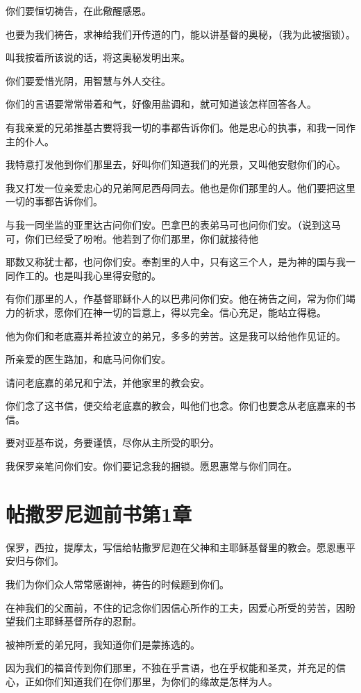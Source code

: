 \documentclass[12pt,oneside]{book}
\begin{document}
你们要恒切祷告，在此儆醒感恩。

也要为我们祷告，求神给我们开传道的门，能以讲基督的奥秘，（我为此被捆锁）。

叫我按着所该说的话，将这奥秘发明出来。

你们要爱惜光阴，用智慧与外人交往。

你们的言语要常常带着和气，好像用盐调和，就可知道该怎样回答各人。

有我亲爱的兄弟推基古要将我一切的事都告诉你们。他是忠心的执事，和我一同作主的仆人。

我特意打发他到你们那里去，好叫你们知道我们的光景，又叫他安慰你们的心。

我又打发一位亲爱忠心的兄弟阿尼西母同去。他也是你们那里的人。他们要把这里一切的事都告诉你们。

与我一同坐监的亚里达古问你们安。巴拿巴的表弟马可也问你们安。（说到这马可，你们已经受了吩咐。他若到了你们那里，你们就接待他

耶数又称犹士都，也问你们安。奉割里的人中，只有这三个人，是为神的国与我一同作工的。也是叫我心里得安慰的。

有你们那里的人，作基督耶稣仆人的以巴弗问你们安。他在祷告之间，常为你们竭力的祈求，愿你们在神一切的旨意上，得以完全。信心充足，能站立得稳。

他为你们和老底嘉并希拉波立的弟兄，多多的劳苦。这是我可以给他作见证的。

所亲爱的医生路加，和底马问你们安。

请问老底嘉的弟兄和宁法，并他家里的教会安。

你们念了这书信，便交给老底嘉的教会，叫他们也念。你们也要念从老底嘉来的书信。

要对亚基布说，务要谨慎，尽你从主所受的职分。

我保罗亲笔问你们安。你们要记念我的捆锁。愿恩惠常与你们同在。

\chapter{帖撒罗尼迦前书第1章}
保罗，西拉，提摩太，写信给帖撒罗尼迦在父神和主耶稣基督里的教会。愿恩惠平安归与你们。

我们为你们众人常常感谢神，祷告的时候题到你们。

在神我们的父面前，不住的记念你们因信心所作的工夫，因爱心所受的劳苦，因盼望我们主耶稣基督所存的忍耐。

被神所爱的弟兄阿，我知道你们是蒙拣选的。

因为我们的福音传到你们那里，不独在乎言语，也在乎权能和圣灵，并充足的信心，正如你们知道我们在你们那里，为你们的缘故是怎样为人。
\end{document}
